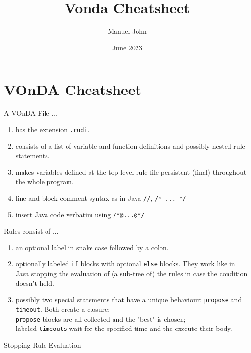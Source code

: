 \documentclass[5pt]{article}
\title{Vonda Cheatsheet}
\author{Manuel John}
\date{June 2023}
\begin{document}
\singlespacing\pagestyle{empty}
\section*{\centering VOnDA Cheatsheet}
    \begin{multicols}{2}
        \begin{bodybox}{A VOnDA File ...}
        \normalsize
        \begin{enumerate}[label=...]
        \itemsep0.5em
             \item has the extension \verb|.rudi|.
             \item  consists of a list of variable and function definitions and possibly nested rule statements.
             \item  makes variables defined at the top-level rule file persistent (final) throughout the whole program.
             \item line and block comment syntax as in Java \verb|//|,
               \verb|/* ... */|
             \item insert Java code verbatim using \verb|/*@...@*/|
        \end{enumerate}
        \end{bodybox}
        \begin{bodybox}{Rules consist of ...}
        \begin{enumerate}[label=...]
        \itemsep0.5em
            \item an optional label in snake case followed by a colon.
            \item optionally labeled \verb|if| blocks with optional \verb|else| blocks. They work like in Java stopping the evaluation of (a sub-tree of) the rules in case the condition doesn't hold.
            \item possibly two special statements that have a unique behaviour: \verb|propose| and \verb|timeout|. Both create a closure;\\
            \verb|propose| blocks are all collected and the "best" is chosen;\\
            labeled \verb|timeouts| wait for the specified time and the execute their body.
        \end{enumerate}
        \end{bodybox}
        \begin{bodybox}{Stopping Rule Evaluation}
            \begin{lstlisting}[language=Java]

\end{lstlisting}
\end{bodybox}
\end{multicols}
\end{document}

